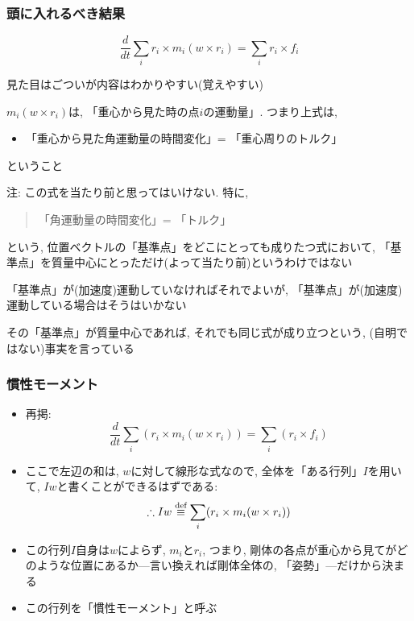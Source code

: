 \documentclass[10pt,dvipdfmx]{beamer}
\newcommand{\ao}[1]{{\color{blue}#1}}
\newcommand{\aka}[1]{{\color{red}#1}}
\begin{document}
\begin{frame}
\frametitle{頭に入れるべき結果}
\begin{itemize}
\item 
\[ \frac{d}{dt} \sum_i r_i \times m_i (w \times r_i) = \sum_i r_i \times f_i \]
\item 見た目はごついが内容はわかりやすい(覚えやすい)
\item $m_i (w \times r_i)$は, 「重心から見た時の点$i$の運動量」. つまり上式は,
\begin{itemize}
\item [] \ao{「重心から見た角運動量の時間変化」= 「重心周りのトルク」}
\end{itemize}
ということ

{\scriptsize
\item 注: この式を当たり前と思ってはいけない. 特に,
\begin{quote}
「角運動量の時間変化」= 「トルク」
\end{quote}
という, \ao{位置ベクトルの「基準点」をどこにとっても}成りたつ式において, 
「基準点」を質量中心にとっただけ(よって当たり前)というわけではない

\item 「基準点」が(加速度)運動していなければそれでよいが,
「基準点」が(加速度)運動している場合はそうはいかない

\item その「基準点」が質量中心であれば, それでも同じ式が成り立つという,
(自明ではない)事実を言っている
}
\end{itemize}
\end{frame}

\begin{frame}
\frametitle{慣性モーメント}
\begin{itemize}
\item [] 再掲:
\[ \frac{d}{dt} \sum_i (r_i \times m_i (w \times r_i)) = \sum_i (r_i \times f_i) \]
\item ここで左辺の和は, 
\aka{$w$に対して線形な式なので, 全体を「ある行列」$I$を用いて,
$Iw$と書くことができるはず}である:
\[ \therefore Iw \stackrel{\mbox{\scriptsize def}}{\equiv} 
\sum_i (r_i \times m_i (w \times r_i)) \]

\item この行列$I$自身は$w$によらず, $m_i$と$r_i$, 
つまり, 剛体の各点が重心から見てがどのような位置にあるか---言い換えれば剛体全体の,
「姿勢」---だけから決まる

\item この行列を「慣性モーメント」と呼ぶ
\end{itemize}
\end{frame}
\end{document}
